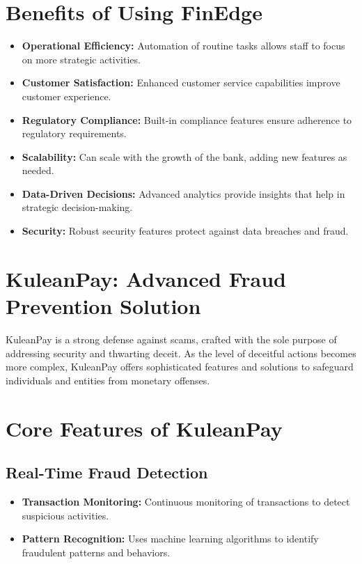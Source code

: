 \documentclass[a4paper,12pt]{report}
\begin{document}
	\section{Benefits of Using FinEdge}
	\begin{itemize}
		\item \textbf{Operational Efficiency:} Automation of routine tasks allows staff to focus on more strategic activities.
		\item \textbf{Customer Satisfaction:} Enhanced customer service capabilities improve customer experience.
		\item \textbf{Regulatory Compliance:} Built-in compliance features ensure adherence to regulatory requirements.
		\item \textbf{Scalability:} Can scale with the growth of the bank, adding new features as needed.
		\item \textbf{Data-Driven Decisions:} Advanced analytics provide insights that help in strategic decision-making.
		\item \textbf{Security:} Robust security features protect against data breaches and fraud.
	\end{itemize}
	

	
	\newpage
	\section{KuleanPay: Advanced Fraud Prevention Solution}
	KuleanPay is a strong defense against scams, crafted with the sole purpose of addressing security and thwarting deceit. As the level of deceitful actions becomes more complex, KuleanPay offers sophisticated features and solutions to safeguard individuals and entities from monetary offenses.
	
	\section{Core Features of KuleanPay}
	
	\subsection{Real-Time Fraud Detection}
	\begin{itemize}
		\item \textbf{Transaction Monitoring:} Continuous monitoring of transactions to detect suspicious activities.
		\item \textbf{Pattern Recognition:} Uses machine learning algorithms to identify fraudulent patterns and behaviors.
	\end{itemize}
	
\end{document}
